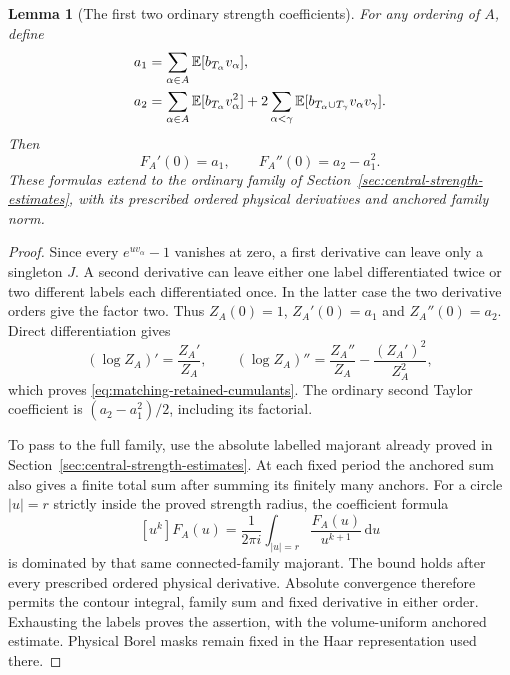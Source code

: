 \documentclass[11pt,reqno]{amsart}
\numberwithin{equation}{section}
\newtheorem{lemma}[theorem]{Lemma}
\theoremstyle{definition}
\theoremstyle{remark}
\newcommand{\dd}{\mathrm d}
\begin{document}
\begin{lemma}[The first two ordinary strength coefficients]
\label{lem:matching-retained-coefficients}
For any ordering of \(A\), define
\begin{align}
 a_1&=\sum_{\alpha\in A}\mathbb E[b_{T_\alpha}v_\alpha],
                                                        \notag\\
 a_2&=\sum_{\alpha\in A}\mathbb E[b_{T_\alpha}v_\alpha^2]
       +2\sum_{\alpha<\gamma}
         \mathbb E[b_{T_\alpha\cup T_\gamma}
                                      v_\alpha v_\gamma].
 \label{eq:matching-retained-moments}
\end{align}
Then
\begin{equation}
               F_A'(0)=a_1,\qquad F_A''(0)=a_2-a_1^2.
 \label{eq:matching-retained-cumulants}
\end{equation}
These formulas extend to the ordinary family of
Section~\ref{sec:central-strength-estimates}, with its
prescribed ordered physical derivatives and anchored
family norm.
\end{lemma}
\begin{proof}
Since every \(e^{uv_\alpha}-1\) vanishes at zero, a first
derivative can leave only a singleton \(J\).
A second derivative can leave either one label differentiated
twice or two different labels each differentiated once.
In the latter case the two derivative orders give the
factor two. Thus \(Z_A(0)=1\), \(Z_A'(0)=a_1\) and
\(Z_A''(0)=a_2\). Direct differentiation gives
\[
 (\log Z_A)'=\frac{Z_A'}{Z_A},\qquad
 (\log Z_A)''=\frac{Z_A''}{Z_A}
                              -\frac{(Z_A')^2}{Z_A^2},
\]
which proves \eqref{eq:matching-retained-cumulants}.
The ordinary second Taylor coefficient is
\((a_2-a_1^2)/2\), including its factorial.

To pass to the full family, use the absolute labelled
majorant already proved in
Section~\ref{sec:central-strength-estimates}.
At each fixed period the anchored sum also gives a finite
total sum after summing its finitely many anchors.
For a circle \(|u|=r\) strictly inside the proved strength
radius, the coefficient formula
\[
 [u^k]F_A(u)=\frac1{2\pi i}
                  \int_{|u|=r}\frac{F_A(u)}{u^{k+1}}\,\dd u
\]
is dominated by that same connected-family majorant.
The bound holds after every prescribed ordered physical
derivative. Absolute convergence therefore permits the
contour integral, family sum and fixed derivative in either
order. Exhausting the labels proves the assertion, with the
volume-uniform anchored estimate. Physical Borel masks
remain fixed in the Haar representation used there.
\end{proof}
\end{document}
